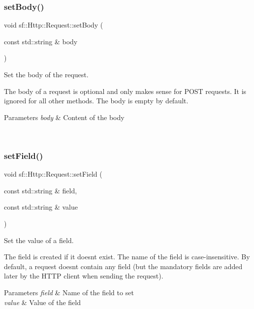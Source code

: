 \subsubsection{\texorpdfstring{setBody()}{setBody()}}
{\footnotesize\ttfamily void sf\+::\+Http\+::\+Request\+::set\+Body (\begin{DoxyParamCaption}\item[{const std\+::string \&}]{body }\end{DoxyParamCaption})}



Set the body of the request. 

The body of a request is optional and only makes sense for P\+O\+ST requests. It is ignored for all other methods. The body is empty by default.


\begin{DoxyParams}{Parameters}
{\em body} & Content of the body \begin{DoxyVerb}\end{DoxyVerb}
 \\
\hline
\end{DoxyParams}
\mbox{\label{classsf_1_1_http_1_1_request_aea672fae5dd089f4b6b3745ed46210d2}} 
\subsubsection{\texorpdfstring{setField()}{setField()}}
{\footnotesize\ttfamily void sf\+::\+Http\+::\+Request\+::set\+Field (\begin{DoxyParamCaption}\item[{const std\+::string \&}]{field,  }\item[{const std\+::string \&}]{value }\end{DoxyParamCaption})}



Set the value of a field. 

The field is created if it doesn\textquotesingle{}t exist. The name of the field is case-\/insensitive. By default, a request doesn\textquotesingle{}t contain any field (but the mandatory fields are added later by the H\+T\+TP client when sending the request).


\begin{DoxyParams}{Parameters}
{\em field} & Name of the field to set \\
\hline
{\em value} & Value of the field \begin{DoxyVerb}\end{DoxyVerb}
 \\
\hline
\end{DoxyParams}
\mbox{\label{classsf_1_1_http_1_1_request_aa683b607b737a6224a91387b4108d3c7}} 
